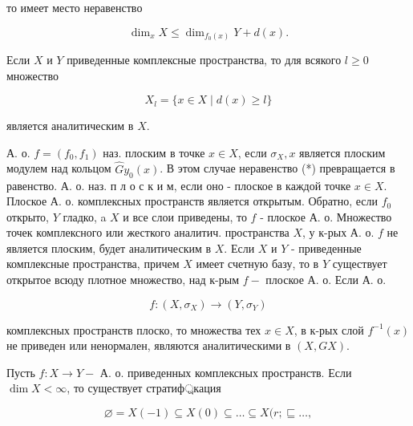 \documentclass[10pt]{article}
\begin{document}
то имеет место неравенство



\[

\operatorname{dim}_{x} X \leqslant \operatorname{dim}_{f_{0}(x)} Y+d(x) .

\]



Если $X$ и $Y$ приведенные комплексные пространства, то для всякого $l \geqslant 0$ множество



\[

X_{l}=\{x \in X \mid d(x) \geqslant l\}

\]



является аналитическим в $X$.



А. о. $f=\left(f_{0}, f_{1}\right)$ наз. плоским в точке $x \in X$, если $\sigma_{X}, x$ является плоским модулем над кольцом $\widehat{G} y_{0}(x)$. В этом случае неравенство (*) превращается в равенство. А. о. наз. п л о с к и м, если оно - плоское в каждой точке $x \in X$. Плоское А. о. комплексных пространств является открытым. Обратно, если $f_{0}$ открыто, $Y$ гладко, a $X$ и все слои приведены, то $f$ - плоское А. о. Множество точек комплексного или жесткого аналитич. пространства $X$, у к-рых А. о. $f$ не является плоским, будет аналитическим в $X$. Если $X$ и $Y$ - приведенные комплексные пространства, причем $X$ имеет счетную базу, то в $Y$ существует открытое всюду плотное множество, над к-рым $f-$ плоское А. о. Если А. о.



\[

f:\left(X, \sigma_{X}\right) \longrightarrow\left(Y, \sigma_{Y}\right)

\]



комплексных пространств плоско, то множества тех $x \in X$, в к-рых слой $f^{-1}(x)$ не приведен или ненормален, являются аналитическими в $(X, G X)$.



Пусть $f: X \rightarrow Y-$ А. о. приведенных комплексных пространств. Если $\operatorname{dim} X<\infty$, то существует стратиф্রкация



\[

\varnothing=X(-1) \subseteq X(0) \subseteq \ldots \subseteq X(r ; \sqsubseteq \ldots,

\]
\end{document}
